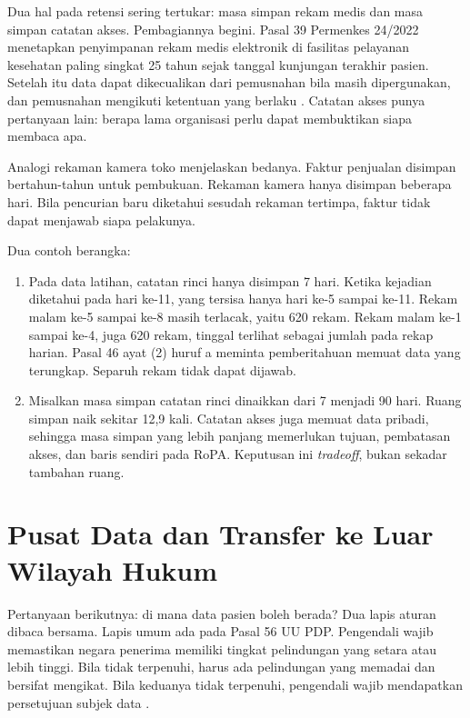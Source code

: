 Dua hal pada retensi sering tertukar: masa simpan rekam medis dan masa simpan catatan akses.
Pembagiannya begini. Pasal 39 Permenkes 24/2022 menetapkan penyimpanan rekam medis elektronik di
fasilitas pelayanan kesehatan paling singkat 25 tahun sejak tanggal kunjungan terakhir pasien.
Setelah itu data dapat dikecualikan dari pemusnahan bila masih dipergunakan, dan pemusnahan
mengikuti ketentuan yang berlaku \cite{permenkes24-2022}. Catatan akses punya pertanyaan lain:
berapa lama organisasi perlu dapat membuktikan siapa membaca apa.

Analogi rekaman kamera toko menjelaskan bedanya. Faktur penjualan disimpan bertahun-tahun untuk
pembukuan. Rekaman kamera hanya disimpan beberapa hari. Bila pencurian baru diketahui sesudah
rekaman tertimpa, faktur tidak dapat menjawab siapa pelakunya.

Dua contoh berangka:
\begin{enumerate}
  \item Pada data latihan, catatan rinci hanya disimpan 7 hari. Ketika kejadian diketahui pada hari
  ke-11, yang tersisa hanya hari ke-5 sampai ke-11. Rekam malam ke-5 sampai ke-8 masih terlacak,
  yaitu 620 rekam. Rekam malam ke-1 sampai ke-4, juga 620 rekam, tinggal terlihat sebagai jumlah
  pada rekap harian. Pasal 46 ayat (2) huruf a meminta pemberitahuan memuat data yang terungkap.
  Separuh rekam tidak dapat dijawab.
  \item Misalkan masa simpan catatan rinci dinaikkan dari 7 menjadi 90 hari. Ruang simpan naik
  sekitar 12,9 kali. Catatan akses juga memuat data pribadi, sehingga masa simpan yang lebih panjang
  memerlukan tujuan, pembatasan akses, dan baris sendiri pada RoPA. Keputusan ini
  \textit{tradeoff}, bukan sekadar tambahan ruang.
\end{enumerate}

\section{Pusat Data dan Transfer ke Luar Wilayah Hukum}

Pertanyaan berikutnya: di mana data pasien boleh berada? Dua lapis aturan dibaca bersama. Lapis umum
ada pada Pasal 56 UU PDP. Pengendali wajib memastikan negara penerima memiliki tingkat pelindungan
yang setara atau lebih tinggi. Bila tidak terpenuhi, harus ada pelindungan yang memadai dan bersifat
mengikat. Bila keduanya tidak terpenuhi, pengendali wajib mendapatkan persetujuan subjek data
\cite{uu27-2022-pdp}.

